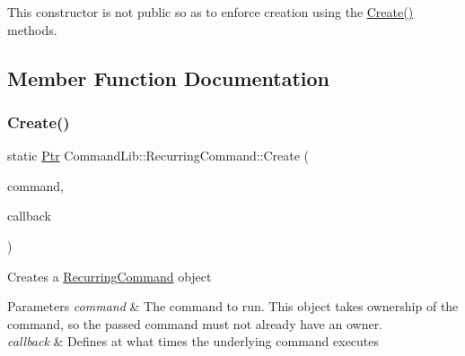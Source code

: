 This constructor is not public so as to enforce creation using the \mbox{\hyperlink{class_command_lib_1_1_recurring_command_afac0e064cbce4cea8fe5d734367b7c3a}{Create()}} methods. 



\subsection{Member Function Documentation}
\mbox{\label{class_command_lib_1_1_recurring_command_afac0e064cbce4cea8fe5d734367b7c3a}} 
\subsubsection{\texorpdfstring{Create()}{Create()}}
{\footnotesize\ttfamily static \mbox{\hyperlink{class_command_lib_1_1_command_a3b3e4f00144373299df5c6bb1acc319d}{Ptr}} Command\+Lib\+::\+Recurring\+Command\+::\+Create (\begin{DoxyParamCaption}\item[{\mbox{\hyperlink{class_command_lib_1_1_command_a3b3e4f00144373299df5c6bb1acc319d}{Command\+::\+Ptr}}}]{command,  }\item[{\mbox{\hyperlink{class_command_lib_1_1_recurring_command_1_1_execution_time_callback}{Execution\+Time\+Callback}} $\ast$}]{callback }\end{DoxyParamCaption})\hspace{0.3cm}{\ttfamily [static]}}



Creates a \mbox{\hyperlink{class_command_lib_1_1_recurring_command}{Recurring\+Command}} object 


\begin{DoxyParams}{Parameters}
{\em command} & The command to run. This object takes ownership of the command, so the passed command must not already have an owner. \\
\hline
{\em callback} & Defines at what times the underlying command executes\\
\hline
\end{DoxyParams}
\mbox{\label{class_command_lib_1_1_recurring_command_a954ee8723b21944ab9aa01df0740b690}} 
